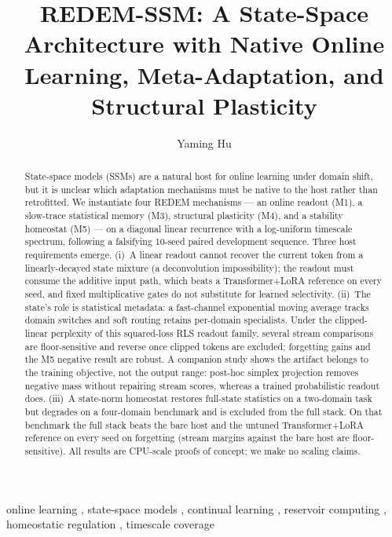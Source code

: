 \documentclass[preprint,12pt]{elsarticle}
\begin{document}
\begin{frontmatter}

\title{REDEM-SSM: A State-Space Architecture with Native Online
Learning, Meta-Adaptation, and Structural Plasticity}

\author[a]{Yaming Hu}
\address[a]{Independent Researcher, Guiyang, Guizhou, China}

\begin{abstract}
State-space models (SSMs) are a natural host for online learning under
domain shift, but it is unclear which adaptation mechanisms must be
native to the host rather than retrofitted. We instantiate four
REDEM mechanisms --- an online readout (M1), a slow-trace statistical
memory (M3), structural plasticity (M4), and a stability homeostat
(M5) --- on a diagonal linear recurrence with a log-uniform timescale
spectrum, following a falsifying 10-seed paired development sequence.
Three host requirements emerge. (i)~A linear readout cannot recover
the current token from a linearly-decayed state mixture (a
deconvolution impossibility); the readout must consume the additive
input path, which beats a Transformer+LoRA reference on every seed,
and fixed multiplicative gates do not substitute for learned
selectivity. (ii)~The state's role is statistical metadata: a
fast-channel exponential moving average tracks domain switches and
soft routing retains per-domain specialists. Under the clipped-linear
perplexity of this squared-loss RLS readout family, several stream
comparisons are floor-sensitive and reverse once clipped tokens are
excluded; forgetting gains and the M5 negative result are robust. A
companion study shows the artifact belongs to the training objective,
not the output range: post-hoc simplex projection removes negative
mass without repairing stream scores, whereas a trained probabilistic
readout does. (iii)~A
state-norm homeostat restores full-state statistics on a two-domain
task but degrades on a four-domain benchmark and is excluded from the
full stack. On that benchmark the full stack beats the bare host and
the untuned Transformer+LoRA reference on every seed on forgetting
(stream margins against the bare host are floor-sensitive). All
results are CPU-scale proofs of concept; we make no scaling claims.
\end{abstract}

\begin{keyword}
online learning \sep
state-space models \sep
continual learning \sep
reservoir computing \sep
homeostatic regulation \sep
timescale coverage
\end{keyword}

\end{frontmatter}
\end{document}
